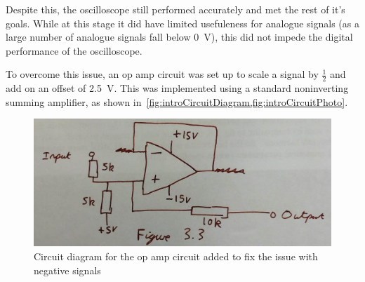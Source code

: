 Despite this, the oscilloscope still performed accurately and met the rest of
it's goals. While at this stage it did have limited usefuleness for analogue
signals (as a large number of analogue signals fall below \SI{0}{\V}), this did
not impede the digital performance of the oscilloscope.

To overcome this issue, an op amp circuit was set up to scale a signal by
$\frac{1}{2}$ and add on an offset of \SI{2.5}{\V}. This was implemented using a
standard noninverting summing amplifier, as shown
in~\cref{fig:introCircuitDiagram,fig:introCircuitPhoto}.

\begin{figure}[h]
  \includegraphics[width=\linewidth]{img/introCircuitDiagram.jpg}
  \caption{Circuit diagram for the op amp circuit added to fix the issue with negative signals}
  \label{fig:introCircuitDiagram}
\end{figure}

